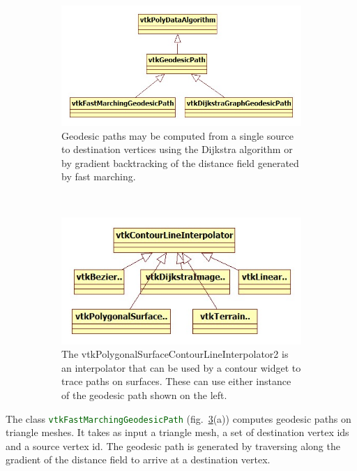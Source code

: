 \documentclass{InsightArticle}
\def\code#1{\small\textcolor{darkgreen}{\texttt{#1}}}
\begin{document}
\begin{figure}
  \centering
  \begin{subfigure}[b]{0.5\textwidth}
    \centering
    \includegraphics[width=\textwidth]{GeodesicPathUML}
    \caption{Geodesic paths may be computed from a single source to destination vertices using the Dijkstra algorithm or by gradient backtracking of the distance field generated by fast marching.}
    \label{fig:GeodesicPathUML}
  \end{subfigure}%
  ~ %
  \begin{subfigure}[b]{0.5\textwidth}
    \centering
    \includegraphics[width=\textwidth]{ContourLineInterpolatorsUML}
    \caption{The vtkPolygonalSurfaceContourLineInterpolator2 is an interpolator that can be used by a contour widget to trace paths on surfaces. These can use either instance of the geodesic path shown on the left.}
    \label{fig:ContourLineInterpolatorUML}
  \end{subfigure}
\caption{ }
\label{fig:GeodesicUMLs}
\end{figure}

The class \code{vtkFastMarchingGeodesicPath} (fig.~\ref{fig:GeodesicUMLs}(a)) computes geodesic paths on triangle meshes. It takes as input a triangle mesh, a set of destination vertex ids and a source vertex id. The geodesic path is generated by traversing along the gradient of the distance field to arrive at a destination vertex.
\end{document}
